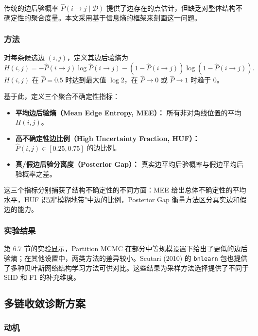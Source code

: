 \documentclass[UTF8,a4paper,12pt]{ctexart}
\begin{document}
传统的边后验概率 $\hat{P}(i \to j \mid \mathcal{D})$ 提供了边存在的点估计，但缺乏对整体结构不确定性的聚合度量。本文采用基于信息熵的框架来刻画这一问题。

\subsubsection{方法}

对每条候选边 $(i, j)$，定义其边后验熵为
\begin{equation}
H(i, j) = -\hat{P}(i \to j) \log \hat{P}(i \to j) - (1 - \hat{P}(i \to j)) \log (1 - \hat{P}(i \to j)).
\end{equation}
$H(i,j)$ 在 $\hat{P} = 0.5$ 时达到最大值 $\log 2$，在 $\hat{P} \to 0$ 或 $\hat{P} \to 1$ 时趋于 0。

基于此，定义三个聚合不确定性指标：
\begin{itemize}
  \item \textbf{平均边后验熵（Mean Edge Entropy, MEE）：} 所有非对角线位置的平均 $H(i,j)$。
  \item \textbf{高不确定性边比例（High Uncertainty Fraction, HUF）：} $\hat{P}(i,j) \in [0.25, 0.75]$ 的边比例。
  \item \textbf{真/假边后验分离度（Posterior Gap）：} 真实边平均后验概率与假边平均后验概率之差。
\end{itemize}

这三个指标分别捕获了结构不确定性的不同方面：MEE 给出总体不确定性的平均水平，HUF 识别"模糊地带"中边的比例，Posterior Gap 衡量方法区分真实边和假边的能力。

\subsubsection{实验结果}

第 6.7 节的实验显示，Partition MCMC 在部分中等规模设置下给出了更低的边后验熵；在其他设置中，两类方法的差异较小。Scutari (2010) 的 \texttt{bnlearn} 包也提供了多种贝叶斯网络结构学习方法可供对比\citep{scutari2010learning}。这些结果为采样方法选择提供了不同于 SHD 和 F1 的补充维度。

\subsection{多链收敛诊断方案}

\subsubsection{动机}
\end{document}
